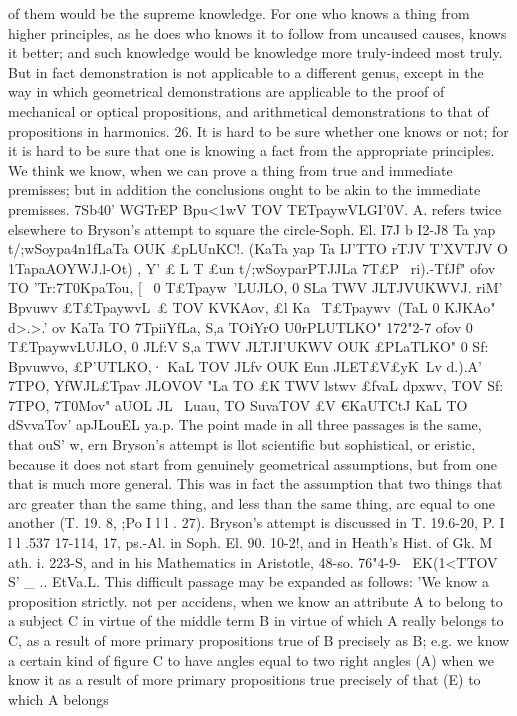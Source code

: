 {{{{{{{{{of them would be the supreme knowledge. For one who knows
a thing from higher principles, as he does who knows it to follow
from uncaused causes, knows it better; and such knowledge would
be knowledge more truly-indeed most truly. But in fact
demonstration is not applicable to a different genus, except in
the way in which geometrical demonstrations are applicable to
the proof of mechanical or optical propositions, and arithmetical
demonstrations to that of propositions in harmonics.
26. It is hard to be sure whether one knows or not; for it is
hard to be sure that one is knowing a fact from the appropriate
principles. We think we know, when we can prove a thing from
true and immediate premisses; but in addition the conclusions
ought to be akin to the immediate premisses.
7Sb40' WGTrEP Bpu<1wV TOV TETpaywVLGI'0V. A. refers twice
elsewhere to Bryson's attempt to square the circle-Soph. El.
I7J b I2-J8 Ta yap t/;wSoypa4n1fLaTa OUK £pLUnKC!. (KaTa yap Ta IJ'TTO
rTJV T'XVTJV O{ 1TapaAOYWJ.l-Ot) ,
Y' £ L T{ £un t/;wSoyparPTJJLa 7T£P~
ri).-T}fJf" ofov TO 'Tr:7T0KpaTou, [~ 0 T£Tpayw~'LUJLO, 0 SLa TWV JLTJV{UKWVJ.
riM'
Bpvuwv £T£TpaywvL~£ TOV KVKAov, £l Ka~ T£Tpaywv{~(TaL 0
KJKAo" d>.>.'
ov KaTa TO 7TpiiYfLa, S,a TOiYrO U0rPLUTLKO" 172"2-7
ofov 0 T£TpaywvLUJLO, 0 JLf:V S,a TWV JLTJI'{UKWV OUK £PLaTLKO" 0 Sf:
Bpvuwvo, £P'UTLKO,· KaL TOV JLfv OUK Eun JLET£V£yK~Lv d.).A' ~ 7TPO,
YfWJL£Tp{av JLOVOV "La TO £K TWV lstwv £fvaL dpxwv, TOV Sf: 7TPO,
7T0Mov" aUOL JL~ Luau, TO SuvaTOV £V €KaUTCtJ KaL TO dSvvaTov' apJLouEL
ya.p. The point made in all three passages is the same, that
ouS'
w,
ern
Bryson's attempt is llot scientific but sophistical, or eristic,
because it does not start from genuinely geometrical assumptions,
but from one that is much more general. This was in fact the
assumption that two things that arc greater than the same thing,
and less than the same thing, arc equal to one another (T. 19. 8,
;Po I l l . 27). Bryson's attempt is discussed in T. 19.6-20, P. I l l .537
17-114, 17, ps.-Al. in Soph. El. 90. 10-2!, and in Heath's Hist.
of Gk. M ath. i. 223-S, and in his Mathematics in Aristotle, 48-so.
76"4-9- ~EK(1<TTOV S' _ .. EtVa.L. This difficult passage may be
expanded as follows: 'We know a proposition strictly. not per
accidens, when we know an attribute A to belong to a subject C
in virtue of the middle term B in virtue of which A really belongs
to C, as a result of more primary propositions true of B precisely
as B; e.g. we know a certain kind of figure C to have angles equal
to two right angles (A) when we know it as a result of more
primary propositions true precisely of that (E) to which A belongs
}}}}}}}}}}}}}}
